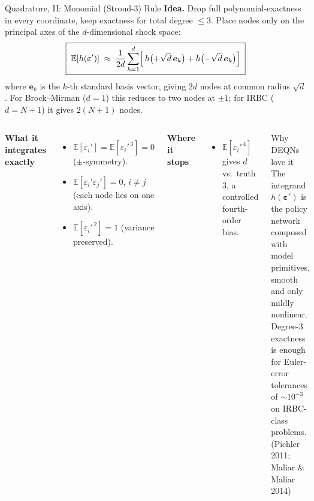 \documentclass[aspectratio=169,11pt]{beamer}
\newcommand{\emphc}[1]{\textcolor{harvardcrimson}{#1}}
\newcommand{\E}[1]{\mathbb{E}\!\left[#1\right]}
\begin{document}
\begin{frame}{Quadrature, II: Monomial (Stroud-3) Rule}
\footnotesize
\textbf{Idea.} Drop full polynomial-exactness in every coordinate, keep exactness for total degree $\le 3$. Place nodes only on the principal axes of the $d$-dimensional shock space:
\[
\boxed{\;
\E{h(\bm\varepsilon')} \;\approx\; \frac{1}{2d} \sum_{k=1}^{d} \Bigl[\, h\bigl(+\sqrt{d}\,\bm{e}_k\bigr) + h\bigl(-\sqrt{d}\,\bm{e}_k\bigr)\Bigr]
\;}
\]
where $\bm{e}_k$ is the $k$-th standard basis vector, giving $2d$ nodes at common radius $\sqrt{d}$.  For Brock--Mirman ($d=1$) this reduces to two nodes at $\pm 1$; for IRBC ($d=N+1$) it gives $2(N+1)$ nodes.

\vspace{0.5em}
\begin{columns}[T]
\textbf{What it integrates exactly}
\begin{itemize}\itemsep1pt
    \item $\mathbb{E}[\varepsilon_i'] = \mathbb{E}[\varepsilon_i'^{\,3}] = 0$ ($\pm$-symmetry).
    \item $\mathbb{E}[\varepsilon_i' \varepsilon_j'] = 0$, $i \neq j$ (each node lies on one axis).
    \item $\mathbb{E}[\varepsilon_i'^{\,2}] = 1$ (variance preserved).
\end{itemize}
\textbf{Where it stops}
\begin{itemize}\itemsep1pt
    \item $\mathbb{E}[\varepsilon_i'^{\,4}]$ gives $d$ vs.\ truth $3$, a controlled fourth-order bias.
\end{itemize}

\begin{block}{Why DEQNs love it}
\scriptsize
The integrand $h(\bm\varepsilon')$ is the policy network composed with model primitives, smooth and only mildly nonlinear. Degree-3 exactness is enough for Euler-error tolerances of $\sim\!10^{-3}$ on IRBC-class problems.\\[2pt]
\emphc{(Pichler 2011; Maliar \& Maliar 2014)}
\end{block}
\end{columns}
\end{frame}
\end{document}
